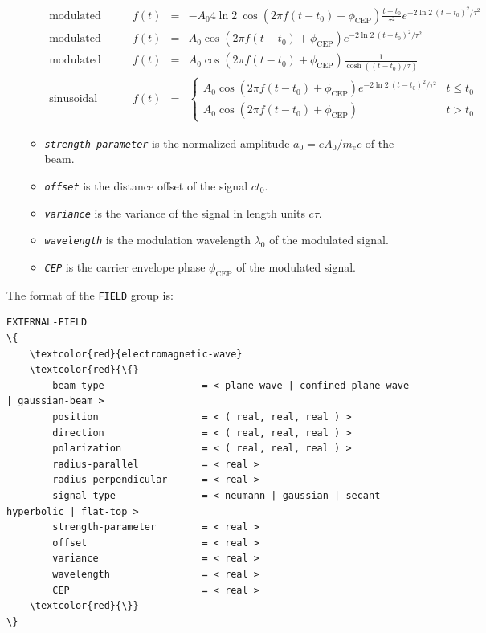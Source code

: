 \begin{enumerate}
\begin{itemize}
	\begin{equation}
	\renewcommand{\arraystretch}{1.5}
	\begin{array}{lrcl}
	\mbox{modulated Neumann:}  \qquad & f(t) & = & \displaystyle - A_0 4 \ln 2 \: \cos( 2 \pi f (t - t_0) + \phi_\mathrm{CEP} ) \frac{t - t_0}{\tau^2} e^{-2 \ln 2 \: (t - t_0)^2/\tau^2 } \\
	\mbox{modulated Gaussian:} \qquad & f(t) & = & \displaystyle A_0 \cos( 2 \pi f (t - t_0) + \phi_\mathrm{CEP} ) e^{-2 \ln 2 \: (t - t_0)^2/\tau^2 } \\
	\mbox{modulated hyperbolic secant:} \qquad & f(t) & = & \displaystyle A_0 \cos( 2 \pi f (t - t_0) + \phi_\mathrm{CEP} ) \frac{1}{\cosh ( (t - t_0)/\tau ) } \\
	\mbox{sinusoidal pulse:}   \qquad & f(t) & = & \displaystyle \left\{ \begin{array}{ll} A_0 \cos( 2 \pi f (t - t_0) + \phi_\mathrm{CEP} ) e^{-2 \ln 2 \: (t - t_0)^2/\tau^2 } & t \leq t_0 \\ A_0 \cos( 2 \pi f (t - t_0) + \phi_\mathrm{CEP} ) & t > t_0 \end{array} \right.
	\end{array}
	\end{equation}
	\item {\tt \small \em strength-parameter} is the normalized amplitude $a_0 = e A_0 / m_ec $ of the beam.
	\item {\tt \small \em offset} is the distance offset of the signal $ct_0$.
	\item {\tt \small \em variance} is the variance of the signal in length units $c\tau$.
	\item {\tt \small \em wavelength} is the modulation wavelength $\lambda_0$ of the modulated signal.
	\item {\tt \small \em CEP} is the carrier envelope phase $\phi_{\mathrm{CEP}}$ of the modulated signal.
\end{itemize}
\end{enumerate}

The format of the \texttt{FIELD} group is:
\begin{Verbatim}[frame=single, fontsize=\small, tabsize=4, fontfamily=courier, fontseries=b, commandchars=\\\{\}, obeytabs]
EXTERNAL-FIELD
\{
	\textcolor{red}{electromagnetic-wave}
	\textcolor{red}{\{}
		beam-type				  = < plane-wave | confined-plane-wave | gaussian-beam >
		position				  = < ( real, real, real ) >
		direction				  = < ( real, real, real ) >
		polarization			  = < ( real, real, real ) >
		radius-parallel			  = < real >
		radius-perpendicular	  = < real >
		signal-type				  = < neumann | gaussian | secant-hyperbolic | flat-top >
		strength-parameter		  = < real >
		offset					  = < real >
		variance				  = < real >
		wavelength				  = < real >
		CEP						  = < real >
	\textcolor{red}{\}}
\}
\end{Verbatim}

